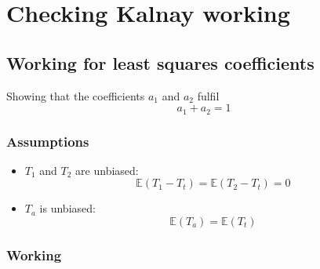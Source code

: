 \chapter{Checking Kalnay working}
\label{app:kalnay_working}

\section{Working for least squares coefficients}
\label{sec:kalnay_working:least_squares}

Showing that the coefficients $a_1$ and $a_2$ fulfil
\begin{equation}
a_1 + a_2 = 1
\end{equation}

\subsection{Assumptions}
\label{sub:least_squares:assumptions}

\begin{itemize}
    \item $T_1$ and $T_2$ are unbiased:
    \begin{equation}
        \mathbb{E}(T_1 - T_t) = \mathbb{E}(T_2 - T_t) = 0
    \end{equation}{}
    \item $T_a$ is unbiased:
    \begin{equation}
        \mathbb{E}(T_a) = \mathbb{E}(T_t)
    \end{equation}
\end{itemize}

\subsection{Working}
\label{sub:least_squares:working}

